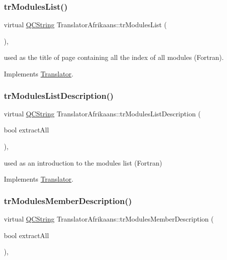 \subsubsection{\texorpdfstring{trModulesList()}{trModulesList()}}
{\footnotesize\ttfamily virtual \mbox{\hyperlink{class_q_c_string}{Q\+C\+String}} Translator\+Afrikaans\+::tr\+Modules\+List (\begin{DoxyParamCaption}{ }\end{DoxyParamCaption})\hspace{0.3cm}{\ttfamily [inline]}, {\ttfamily [virtual]}}

used as the title of page containing all the index of all modules (Fortran). 

Implements \mbox{\hyperlink{class_translator}{Translator}}.

\mbox{\label{class_translator_afrikaans_a063d5d3d710cefa2a3f41ef010a74c3d}} 
\subsubsection{\texorpdfstring{trModulesListDescription()}{trModulesListDescription()}}
{\footnotesize\ttfamily virtual \mbox{\hyperlink{class_q_c_string}{Q\+C\+String}} Translator\+Afrikaans\+::tr\+Modules\+List\+Description (\begin{DoxyParamCaption}\item[{bool}]{extract\+All }\end{DoxyParamCaption})\hspace{0.3cm}{\ttfamily [inline]}, {\ttfamily [virtual]}}

used as an introduction to the modules list (Fortran) 

Implements \mbox{\hyperlink{class_translator}{Translator}}.

\mbox{\label{class_translator_afrikaans_a47f9ec95adb2dfcc71c7ffb2a3c9fa64}} 
\subsubsection{\texorpdfstring{trModulesMemberDescription()}{trModulesMemberDescription()}}
{\footnotesize\ttfamily virtual \mbox{\hyperlink{class_q_c_string}{Q\+C\+String}} Translator\+Afrikaans\+::tr\+Modules\+Member\+Description (\begin{DoxyParamCaption}\item[{bool}]{extract\+All }\end{DoxyParamCaption})\hspace{0.3cm}{\ttfamily [inline]}, {\ttfamily [virtual]}}

